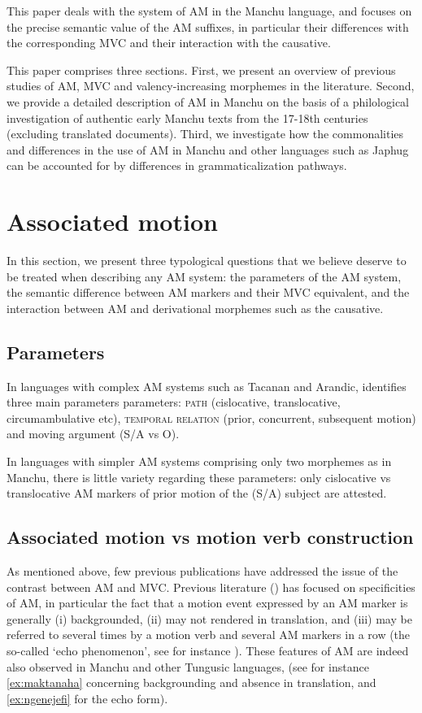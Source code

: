 \documentclass{article}
\begin{document}
This paper deals with the system of AM in the Manchu language, and focuses on the precise semantic value of the AM suffixes, in particular their differences with the corresponding MVC and their interaction with the causative. 

This paper comprises three sections. First, we present an overview of previous studies of AM, MVC and valency-increasing morphemes in the literature. Second, we provide a detailed description of AM in Manchu on the basis of a philological investigation of authentic early Manchu texts from the 17-18th centuries (excluding translated documents). Third, we investigate how the commonalities and differences in the use of AM in Manchu and other languages such as Japhug can be accounted for by differences in grammaticalization pathways.

\section{Associated motion}
In this section, we present three typological questions that we believe deserve to be treated when describing any AM system: the parameters of the AM system, the semantic difference between AM markers and their MVC equivalent, and the interaction between AM and derivational morphemes such as the causative.

\subsection{Parameters}
In languages with complex AM systems such as Tacanan and Arandic, \citet[8]{guillaume16am} identifies three main parameters parameters: \textsc{path} (cislocative, translocative, circumambulative etc),  \textsc{temporal relation} (prior, concurrent, subsequent motion) and moving argument (S/A vs O). 

In languages with simpler AM systems comprising only two morphemes as in Manchu, there is little variety regarding these parameters: only cislocative vs translocative AM markers of prior motion of the (S/A) subject are attested.

\subsection{Associated motion vs motion verb construction} \label{sec:japhug.am.mvc}
As mentioned above, few previous publications have addressed the issue of the contrast between AM and MVC. Previous literature (\citealt{wilkins91associated.motion, guillaume16am}) has focused on specificities of AM, in particular the fact that a motion event expressed by an AM marker is generally (i) backgrounded, (ii) may not rendered in translation, and (iii) may be referred to several times by a motion verb and several AM markers in a row (the so-called `echo phenomenon', see for instance \citealt[11]{guillaume16am}). These features of AM are indeed also observed in Manchu and other Tungusic languages,  (see for instance \ref{ex:maktanaha} concerning backgrounding and absence in translation, and \ref{ex:ngenejefi} for the echo form).
\end{document}
